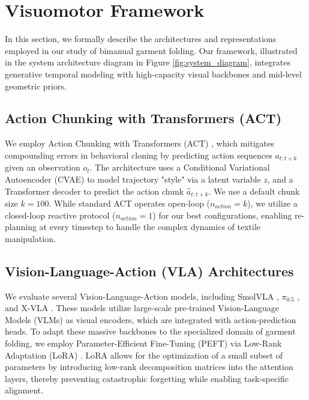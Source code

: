 \section{Visuomotor Framework}
\label{sec:method}

In this section, we formally describe the architectures and representations employed in our study of bimanual garment folding. Our framework, illustrated in the system architecture diagram in Figure \ref{fig:system_diagram}, integrates generative temporal modeling with high-capacity visual backbones and mid-level geometric priors.

\subsection{Action Chunking with Transformers (ACT)}
We employ Action Chunking with Transformers (ACT) \cite{zhao2023act}, which mitigates compounding errors in behavioral cloning by predicting action sequences $a_{t:t+k}$ given an observation $o_t$. The architecture uses a Conditional Variational Autoencoder (CVAE) to model trajectory "style" via a latent variable $z$, and a Transformer decoder to predict the action chunk $\hat{a}_{t:t+k}$. We use a default chunk size $k=100$. While standard ACT operates open-loop ($n_{action}=k$), we utilize a closed-loop reactive protocol ($n_{action}=1$) for our best configurations, enabling re-planning at every timestep to handle the complex dynamics of textile manipulation.

\subsection{Vision-Language-Action (VLA) Architectures}
We evaluate several Vision-Language-Action models, including SmolVLA \cite{smolvla2025}, $\pi_{0.5}$ \cite{pi05_2026}, and X-VLA \cite{zheng2025xvlasoftpromptedtransformerscalable}. These models utilize large-scale pre-trained Vision-Language Models (VLMs) as visual encoders, which are integrated with action-prediction heads. To adapt these massive backbones to the specialized domain of garment folding, we employ Parameter-Efficient Fine-Tuning (PEFT) via Low-Rank Adaptation (LoRA) \cite{hu2021lora}. LoRA allows for the optimization of a small subset of parameters by introducing low-rank decomposition matrices into the attention layers, thereby preventing catastrophic forgetting while enabling task-specific alignment.

